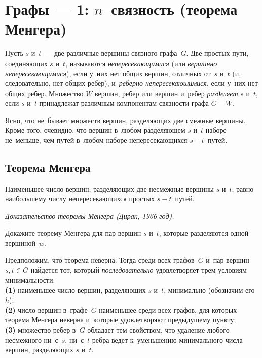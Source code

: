 

\section*{Графы --- 1: $n$--связность (теорема Менгера)}


Пусть $s$ и~$t$~--- две различные вершины связного графа~$G$.
Две простых пути, соединяющих $s$ и~$t$, называются \emph{непересекающимися}
(или \emph{вершинно непересекающимися}), если у~них нет общих вершин, отличных
от~$s$ и~$t$ (и, следовательно, нет общих ребер),
и~\emph{реберно непересекающимися}, если у~них нет общих ребер.
Множество $W$ вершин, ребер или вершин и~ребер \emph{разделяет} $s$ и~$t$, если
$s$ и~$t$ принадлежат различным компонентам связности графа $G - W$.

\observation
Ясно, что не~бывает множеств вершин, разделяющих две смежные вершины.
Кроме того, очевидно, что вершин в~любом разделяющем $s$ и~$t$ наборе
не~меньше, чем путей в~любом наборе непересекающихся $s {-} t$~путей.

\subsection*{Теорема Менгера}

Наименьшее число вершин, разделяющих две несмежные вершины $s$ и~$t$, равно
наибольшему числу непересекающихся простых $s {-} t$~путей.

\emph{Доказательство теоремы Менгера (Дирак, 1966 год).}

\begin{problems}

\item
Докажите теорему Менгера для пар вершин $s$ и~$t$, которые разделяются одной
вершиной~$w$.

\end{problems}

Предположим, что теорема неверна.
Тогда среди всех графов~$G$ и~пар вершин $s, t \in G$ найдется тот, который
\emph{последовательно} удовлетворяет трем условиям минимальности:
\\
\textbf{(1)}
наименьшее число вершин, разделяющих $s$ и~$t$, минимально
(обозначим его~$h$);
\\
\textbf{(2)}
число вершин в~графе~$G$ наименьшее среди всех графов, для которых
теорема Менгера неверна и~которые удовлетворяют предыдущему пункту;
\\
\textbf{(3)}
множество ребер в~$G$ обладает тем свойством, что удаление любого несмежного
ни~с~$s$, ни~с~$t$ ребра ведет к~уменьшению минимального числа вершин,
разделяющих $s$ и~$t$.


